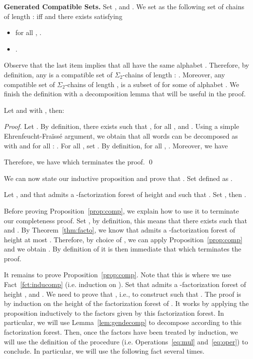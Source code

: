 \documentclass[envcountsame]{llncs}
\newcommand{\efgame}{Ehrenfeucht-Fra\"iss\'e\xspace}
\newcommand{\sic}[1]{\ensuremath{\Sigma_{#1}}\xspace}
\newcommand\chains{chains\xspace}
\newcommand\qchains[1]{\ensuremath{\sic{#1}}-chains\xspace}
\newcommand\dchains{\qchains{2}}
\begin{document}
\medskip
\noindent
{\bf Generated Compatible Sets.} Set ,  and . We set  as the following set
of \chains of length :  iff
 and there exists  satisfying
\begin{itemize}
\item for all , .
\item .
\end{itemize}
\noindent
Observe that the last item implies that all  have the same
alphabet . Therefore, by definition, any  is a compatible set of
\dchains of length : . Moreover, any compatible set of \dchains of
length ,  is a subset of  for
some  of alphabet . We finish the definition with a decomposition lemma
that will be useful in the proof.


\begin{lemma} \label{lem:gendecomp}
  Let  and  with , then: 
  
\end{lemma}


\begin{proof}
  Let . By definition,
  there exists  such that , for
  all ,  and . Using a simple \efgame argument, we obtain that all words 
  can be decomposed as  with  and for all : . For all , set . By definition, for all , . Moreover, we have 
  
  Therefore, we have  which terminates the proof. \qed
\end{proof}

We can now state our inductive proposition and prove that
. Set  defined as 
.

\begin{proposition} \label{prop:comp}
  Let ,  and  that admits a
  -factorization forest of height  and such that . Set , then .
\end{proposition}

Before proving Proposition~\ref{prop:comp}, we explain how to use it
to terminate our completeness proof. Set , by definition, this means that there exists
 such that  and . By Theorem~\ref{thm:facto}, we know that  admits a
-factorization forest of height at most .
Therefore, by choice of , we can apply
Proposition~\ref{prop:comp} and we obtain . By definition of
 it is then immediate that  which terminates the proof.

It remains to prove Proposition~\ref{prop:comp}. Note that this is
where we use Fact~\ref{fct:inducomp} (i.e. induction on ).
Set  that admits a -factorization forest of height
,  and . We need to prove that , i.e., to construct  such that . The proof is by induction on the height  of the factorization
forest of . It works by applying the proposition inductively to
the factors given by this factorization forest. In particular, we
will use Lemma~\ref{lem:gendecomp} to decompose 
according to this factorization forest. Then, once the factors have
been treated by induction, we will use the definition of the
procedure  (i.e. Operations~\eqref{eq:mul} and~\eqref{eq:oper})
to conclude. In particular, we will use the following fact several
times.
\end{document}
